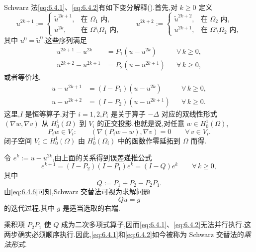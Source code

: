 Schwarz 法\eqref{eq:6.4.1}、\eqref{eq:6.4.2}有如下变分解释().首先,对 \(k\ge0\) 定义
\[
  u^{2k+1}:=
  \begin{cases}
    \widetilde u^{2k+1},&\text{在 }\Omega_1\text{ 内},\\
    u^{2k},&\text{在 }\Omega\setminus\Omega_1\text{ 内},
  \end{cases}
  \qquad
  u^{2k+2}:=
  \begin{cases}
    \widetilde u^{2k+2},&\text{在 }\Omega_2\text{ 内},\\
    u^{2k+1},&\text{在 }\Omega\setminus\Omega_2\text{ 内},
  \end{cases}
\]
其中 \(u^0=\widetilde u^0\).这些序列满足
\[
  \begin{aligned}
    u^{2k+1}-u^{2k}&=P_1(u-u^{2k})&&\forall\,k\ge0,\\
    u^{2k+2}-u^{2k+1}&=P_2(u-u^{2k+1})&&\forall\,k\ge0,
  \end{aligned}
\]
或者等价地,
\[
  \begin{aligned}
    u-u^{2k+1}&=(I-P_1)(u-u^{2k})&&\forall\,k\ge0,\\
    u-u^{2k+2}&=(I-P_2)(u-u^{2k+1})&&\forall\,k\ge0.
  \end{aligned}
\]
这里,\(I\) 是恒等算子.对于 \(i=1,2\),\(P_i\) 是关于算子 \(-\Delta\) 对应的双线性形式 \((\nabla w,\nabla v)\) 从 \(H_0^1(\Omega)\) 到 \(V_i\) 的正交投影.也就是说,对任意 \(w\in H_0^1(\Omega)\),
\begin{equation}\label{eq:6.4.5}
  P_iw\in V_i:\qquad(\nabla(P_iw-w),\nabla v)=0\qquad\forall\, v\in V_i.
\end{equation}
闭子空间 \(V_i\subset H_0^1(\Omega)\) 由 \(H_0^1(\Omega_i)\) 中的函数作零延拓到 \(\Omega\) 而得.

令 \(e^k:=u-u^{2k}\),由上面的关系得到误差递推公式
\begin{equation}\label{eq:6.4.6}
  e^{k+1}=(I-P_2)(I-P_1)e^k=(I-Q)e^k\qquad\forall\,k\ge0,
\end{equation}
其中
\begin{equation}\label{eq:6.4.7}
  Q:=P_1+P_2-P_2P_1.
\end{equation}
由\eqref{eq:6.4.6}可知,Schwarz 交替法可视为求解问题
\begin{equation}\label{eq:6.4.8}
  Qu=g
\end{equation}
的迭代过程,其中 \(g\) 是适当选取的右端.

乘积项 \(P_2P_1\) 使 \(Q\) 成为二次多项式算子,因而\eqref{eq:6.4.1}、\eqref{eq:6.4.2}无法并行执行.这两步确实必须顺序执行.因此,\eqref{eq:6.4.1}和\eqref{eq:6.4.2}如今被称为 Schwarz 交替法的\emph{乘法形式}.

